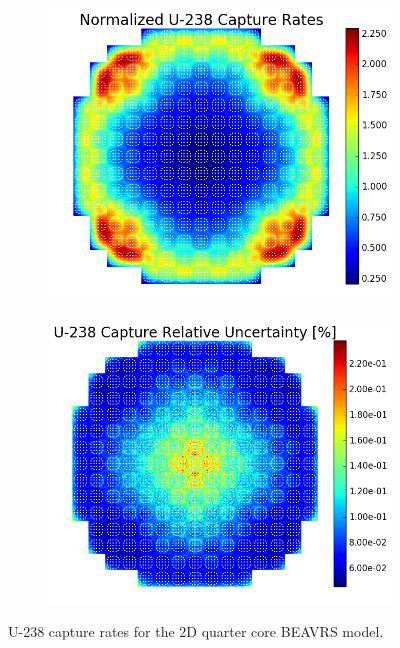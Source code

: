 \begin{figure}[h!]
\centering
\begin{subfigure}{0.44\textwidth}
  \centering
  \includegraphics[width=\linewidth]{figures/benchmarks/capture-rates/capt-mean-full-core}
  \caption{}
  \label{fig:chap7-capt-rate-mean-full-core}
\end{subfigure}%
\begin{subfigure}{0.44\textwidth}
  \centering
  \includegraphics[width=\linewidth]{figures/benchmarks/capture-rates/capt-rel-err-full-core}
  \caption{}
  \label{fig:chap7-capt-rate-rel-err-full-core}
\end{subfigure}%
\caption[U-238 capture rates for the full 2D BEAVRS core]{U-238 capture rates for the 2D quarter core \ac{BEAVRS} model.}
\label{fig:chap7-capt-rates-full-core}
\end{figure}

